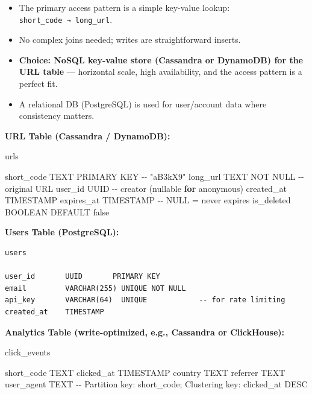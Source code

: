 \documentclass[11pt]{article}
\providecommand{\tightlist}{\setlength{\itemsep}{1pt}\setlength{\parskip}{0pt}}
\newenvironment{Shaded}{\begin{snugshade}}{\end{snugshade}}
\newcommand{\ControlFlowTok}[1]{\textcolor[rgb]{0.99,0.74,0.29}{\textbf{#1}}}
\newcommand{\NormalTok}[1]{\textcolor[rgb]{0.81,0.81,0.76}{#1}}
\newcommand{\OperatorTok}[1]{\textcolor[rgb]{0.81,0.81,0.76}{#1}}
\newcommand{\StringTok}[1]{\textcolor[rgb]{0.96,0.31,0.31}{#1}}
\begin{document}
\begin{itemize}
\tightlist
\item
  The primary access pattern is a simple key-value lookup: \texttt{short\_code\ →\ long\_url}.
\item
  No complex joins needed; writes are straightforward inserts.
\item
  \textbf{Choice: NoSQL key-value store (Cassandra or DynamoDB) for the URL table} --- horizontal scale, high availability, and the access pattern is a perfect fit.
\item
  A relational DB (PostgreSQL) is used for user/account data where consistency matters.
\end{itemize}

\textbf{URL Table (Cassandra / DynamoDB):}


\begin{Shaded}
\begin{Highlighting}[]
\NormalTok{urls}

\NormalTok{short\_code    TEXT       PRIMARY KEY        }\OperatorTok{{-}{-}} \StringTok{"aB3kX9"}
\NormalTok{long\_url      TEXT       NOT NULL           }\OperatorTok{{-}{-}}\NormalTok{ original URL}
\NormalTok{user\_id       UUID                          }\OperatorTok{{-}{-}}\NormalTok{ creator (nullable }\ControlFlowTok{for}\NormalTok{ anonymous)}
\NormalTok{created\_at    TIMESTAMP}
\NormalTok{expires\_at    TIMESTAMP                     }\OperatorTok{{-}{-}}\NormalTok{ NULL }\OperatorTok{=}\NormalTok{ never expires}
\NormalTok{is\_deleted    BOOLEAN    DEFAULT false}
\end{Highlighting}
\end{Shaded}

\textbf{Users Table (PostgreSQL):}

\setcodelang{}

\begin{verbatim}
users

user_id       UUID       PRIMARY KEY
email         VARCHAR(255) UNIQUE NOT NULL
api_key       VARCHAR(64)  UNIQUE            -- for rate limiting
created_at    TIMESTAMP
\end{verbatim}

\textbf{Analytics Table (write-optimized, e.g., Cassandra or ClickHouse):}


\begin{Shaded}
\begin{Highlighting}[]
\NormalTok{click\_events}

\NormalTok{short\_code    TEXT}
\NormalTok{clicked\_at    TIMESTAMP}
\NormalTok{country       TEXT}
\NormalTok{referrer      TEXT}
\NormalTok{user\_agent    TEXT}
\OperatorTok{{-}{-}}\NormalTok{ Partition key: short\_code}\OperatorTok{;}\NormalTok{ Clustering key: clicked\_at DESC}
\end{Highlighting}
\end{Shaded}
\end{document}
